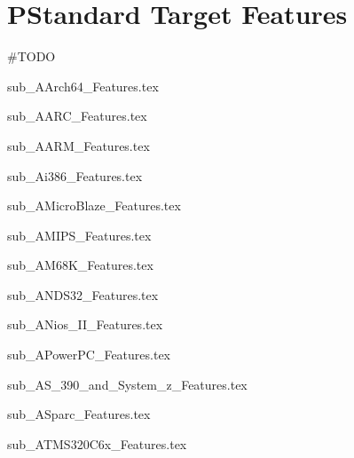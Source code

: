 \section{PStandard Target Features}
\#TODO

{sub_AArch64_Features.tex}

{sub_AARC_Features.tex}

{sub_AARM_Features.tex}

{sub_Ai386_Features.tex}

{sub_AMicroBlaze_Features.tex}

{sub_AMIPS_Features.tex}

{sub_AM68K_Features.tex}

{sub_ANDS32_Features.tex}

{sub_ANios_II_Features.tex}

{sub_APowerPC_Features.tex}

{sub_AS_390_and_System_z_Features.tex}

{sub_ASparc_Features.tex}

{sub_ATMS320C6x_Features.tex}
